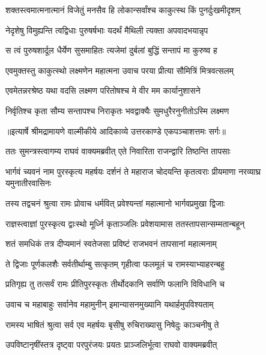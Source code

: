 \twolineshloka
{शक्तस्त्वमात्मनात्मानं विजेतुं मनसैव हि}
{लोकान्सर्वांश्च काकुत्स्थ किं पुनर्दुःखमीदृशम्} %

\twolineshloka
{नेदृशेषु विमुह्यन्ति त्वद्विधाः पुरुषर्षभाः}
{यदर्थं मैथिली त्यक्ता अपवादभयान्नृप} %

\twolineshloka
{स त्वं पुरुषशार्दूल धैर्येण सुसमाहितः}
{त्यजेमां दुर्बलां बुद्धिं सन्तापं मा कुरुष्व ह} %

\twolineshloka
{एवमुक्तस्तु काकुत्स्थो लक्ष्मणेन महात्मना}
{उवाच परया प्रीत्या सौमित्रिं मित्रवत्सलम्} %

\twolineshloka
{एवमेतन्नरश्रेष्ठ यथा वदसि लक्ष्मण}
{परितोषश्च मे वीर मम कार्यानुशासने} %

\twolineshloka
{निर्वृतिश्च कृता सौम्य सन्तापश्च निराकृतः}
{भवद्वाक्यैः सुमधुरैरनुनीतोऽस्मि लक्ष्मण} %


{॥इत्यार्षे श्रीमद्रामायणे वाल्मीकीये आदिकाव्ये उत्तरकाण्डे एकपञ्चाशत्तमः सर्गः॥}


\twolineshloka
{ततः सुमन्त्रस्त्वागम्य राघवं वाक्यमब्रवीत्}
{एते निवारिता राजन्द्वारि तिष्ठन्ति तापसाः} %

\threelineshloka
{भार्गवं च्यवनं नाम पुरस्कृत्य महर्षयः}
{दर्शनं ते महाराज चोदयन्ति कृतत्वराः}
{प्रीयमाणा नरव्याघ्र यमुनातीरवासिनः} %

\twolineshloka
{तस्य तद्वचनं श्रुत्वा रामः प्रोवाच धर्मवित्}
{प्रवेश्यन्तां महात्मानो भार्गवप्रमुखा द्विजाः} %

\twolineshloka
{राज्ञस्त्वाज्ञां पुरस्कृत्य द्वाःस्थो मूर्ध्नि कृताञ्जलिः}
{प्रवेशयामास ततस्तापसान्सम्मतान्बहून्} %

\twolineshloka
{शतं समधिकं तत्र दीप्यमानं स्वतेजसा}
{प्रविष्टं राजभवनं तापसानां महात्मनाम्} %

\twolineshloka
{ते द्विजाः पूर्णकलशैः सर्वतीर्थाम्बु सत्कृतम्}
{गृहीत्वा फलमूलं च रामस्याभ्याहरन्बहु} %

\twolineshloka
{प्रतिगृह्य तु तत्सर्वं रामः प्रीतिपुरस्कृतः}
{तीर्थोदकानि सर्वाणि फलानि विविधानि च} %

\twolineshloka
{उवाच च महाबाहुः सर्वानेव महामुनीन्}
{इमान्यासनमुख्यानि यथार्हमुपविश्यताम्} %

\twolineshloka
{रामस्य भाषितं श्रुत्वा सर्व एव महर्षयः}
{बृसीषु रुचिराख्यासु निषेदुः काञ्चनीषु ते} %

\twolineshloka
{उपविष्टानृषींस्तत्र दृष्ट्वा परपुरंजयः}
{प्रयतः प्राञ्जलिर्भूत्वा राघवो वाक्यमब्रवीत्} %

